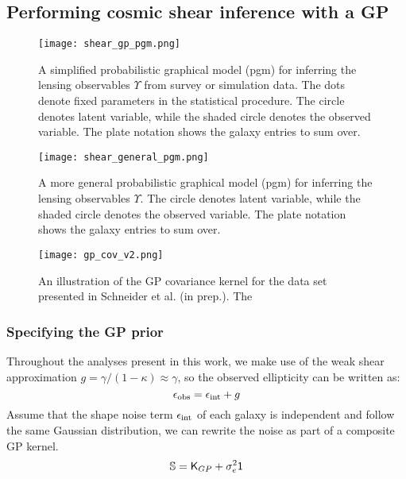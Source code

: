 \subsection{Performing cosmic shear inference with a GP}
\begin{figure}
	\centering
	\texttt{[image: shear\_gp\_pgm.png]}
	\caption{A simplified probabilistic graphical model (pgm) for inferring
		the lensing observables $\Upsilon$ from survey or simulation data. The dots
		denote fixed parameters in the statistical procedure. The circle denotes
		latent variable, while the shaded circle denotes 
		the observed variable. The plate notation shows the galaxy entries to sum
		over.
		\label{fig:simplified_pgm}}
\end{figure}

\begin{figure}
	\centering
	\texttt{[image: shear\_general\_pgm.png]}
	\caption{A more general probabilistic graphical model (pgm) for inferring
		the lensing observables $\Upsilon$. The circle denotes
		latent variable, while the shaded circle denotes 
		the observed variable. The plate notation shows the galaxy entries to sum
		over.
		\label{fig:general_pgm}}
\end{figure}

\begin{figure}
	\centering
	\texttt{[image: gp\_cov\_v2.png]}
	\caption{An illustration of the GP covariance kernel for the data set
		presented in Schneider et al. (in prep.). The  
		\label{fig:GP_kernel_vis}}
\end{figure}

\subsubsection{Specifying the GP prior}
Throughout the analyses present in this work, 
we make use of the weak shear approximation 
$g = \gamma / (1 - \kappa)  \approx \gamma$, so the observed ellipticity can be
written as: 
\begin{equation}
	\epsilon_{\rm obs} = \epsilon_{\rm int} + g 
\end{equation}
Assume that the shape noise term $\epsilon_{\rm int}$ of each galaxy is 
independent and follow the same Gaussian distribution, we can rewrite  
the noise as part of a composite GP kernel. 
\begin{equation}
	\mathbb{S} = \mathsf{K}_{GP} + \sigma_e^2 \mathsf{1}   
\end{equation}



